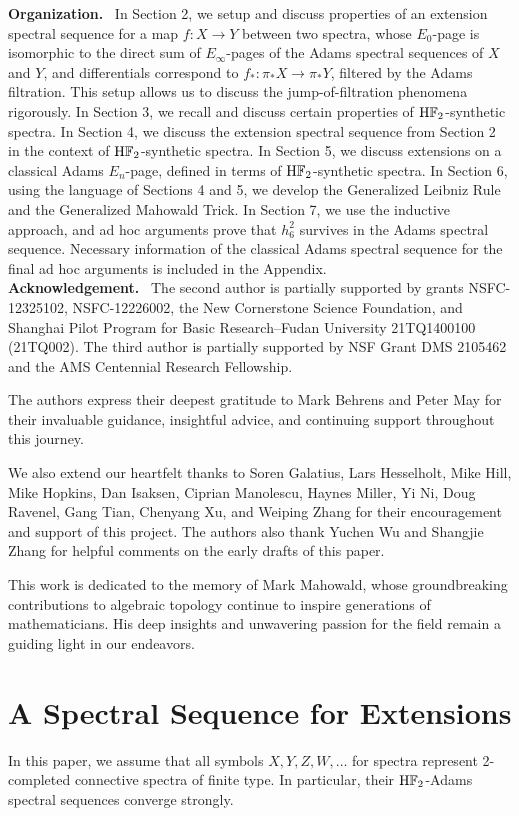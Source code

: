 \documentclass{amsart}
\numberwithin{equation}{section}
\newcommand{\HF}{\mathrm{H}\bF_2}
\begin{document}
\noindent\textbf{Organization.} \ In Section 2, we setup and discuss properties of an extension spectral sequence for a map $f: X\to Y$ between two spectra, whose $E_0$-page is isomorphic to the direct sum of $E_\infty$-pages of the Adams spectral sequences of $X$ and $Y$, and differentials correspond to $f_*: \pi_*X \to \pi_*Y$, filtered by the Adams filtration. This setup allows us to discuss the jump-of-filtration phenomena rigorously. In Section 3, we recall and discuss certain properties of $\HF$-synthetic spectra. In Section 4, we discuss the extension spectral sequence from Section 2 in the context of $\HF$-synthetic spectra. In Section 5, we discuss extensions on a classical Adams $E_n$-page, defined in terms of $\HF$-synthetic spectra. In Section 6, using the language of Sections 4 and 5, we develop the Generalized Leibniz Rule and the Generalized Mahowald Trick. In Section 7, we use the inductive approach, and ad hoc arguments prove that $h_6^2$ survives in the Adams spectral sequence. Necessary information of the classical Adams spectral sequence for the final ad hoc arguments is included in the Appendix.\\

\noindent\textbf{Acknowledgement.} \ The second author is partially supported by grants NSFC-12325102, NSFC-12226002, the New Cornerstone Science Foundation, and Shanghai Pilot Program for Basic Research–Fudan University 21TQ1400100 (21TQ002). The third author is partially supported by NSF Grant DMS 2105462 and the AMS Centennial Research Fellowship. 

The authors express their deepest gratitude to Mark Behrens and Peter May for their invaluable guidance, insightful advice, and continuing support throughout this journey.

We also extend our heartfelt thanks to Soren Galatius, Lars Hesselholt, Mike Hill, Mike Hopkins, Dan Isaksen, Ciprian Manolescu, Haynes Miller, Yi Ni, Doug Ravenel, Gang Tian, Chenyang Xu, and Weiping Zhang for their encouragement and support of this project. The authors also thank Yuchen Wu and Shangjie Zhang for helpful comments on the early drafts of this paper. 

This work is dedicated to the memory of Mark Mahowald, whose groundbreaking contributions to algebraic topology continue to inspire generations of mathematicians. His deep insights and unwavering passion for the field remain a guiding light in our endeavors.

\section{A Spectral Sequence for Extensions}\label{sec:e6be737c}
In this paper, we assume that all symbols $X,Y,Z,W,\dots$ for spectra represent 2-completed connective spectra of finite type. In particular, their $\HF$-Adams spectral sequences converge strongly.
\end{document}
